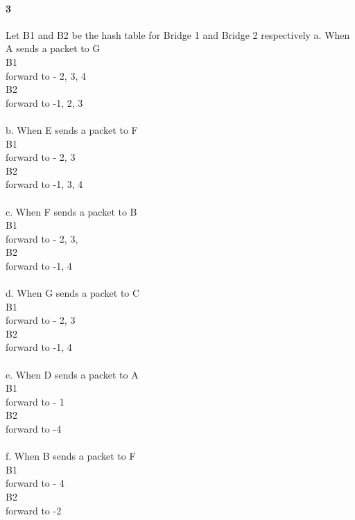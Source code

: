 \documentclass[24 pts]{article}
\begin{document}
\paragraph{3}

Let B1 and B2 be the hash table for Bridge 1 and Bridge 2 respectively
a. When A sends a packet to G\\
B1\\
forward to - 2, 3, 4\\
B2\\
forward to -1, 2, 3
\paragraph{}

b. When E sends a packet to F\\
B1\\
forward to - 2, 3\\
B2\\
forward to -1, 3, 4
\paragraph{}

c.  When F sends a packet to B\\
B1\\
forward to - 2, 3,\\
B2\\
forward to -1, 4
\paragraph{}

d. When G sends a packet to C\\
B1\\
forward to - 2, 3\\
B2\\
forward to -1, 4
\paragraph{}

e. When D sends a packet to A\\
B1\\
forward to - 1\\
B2\\
forward to -4
\paragraph{}

f. When B sends a packet to F\\
B1\\
forward to - 4\\
B2\\
forward to -2
\end{document}
